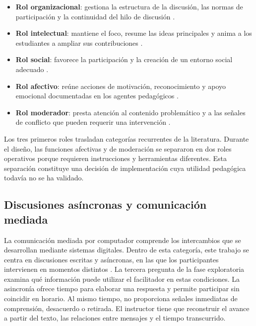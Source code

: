 \begin{itemize}
    \item \textbf{Rol organizacional}: gestiona la estructura de la discusión, las normas de participación y la continuidad del hilo de discusión \parencite{Abdous2011,PilkingtonWalker2003}.
    \item \textbf{Rol intelectual}: mantiene el foco, resume las ideas principales y anima a los estudiantes a ampliar sus contribuciones \parencite{Abdous2011}.
    \item \textbf{Rol social}: favorece la participación y la creación de un entorno social adecuado \parencite{Paulsen1995,Abdous2011}.
    \item \textbf{Rol afectivo}: reúne acciones de motivación, reconocimiento y apoyo emocional documentadas en los agentes pedagógicos \parencite{SikstromEtAl2022,BlignautTrollip2003}.
    \item \textbf{Rol moderador}: presta atención al contenido problemático y a las señales de conflicto que pueden requerir una intervención \parencite{Rovai2007,KorreEtAl2025}.
\end{itemize}

Los tres primeros roles trasladan categorías recurrentes de la literatura. Durante el diseño, las funciones afectivas y de moderación se separaron en dos roles operativos porque requieren instrucciones y herramientas diferentes. Esta separación constituye una decisión de implementación cuya utilidad pedagógica todavía no se ha validado.

\subsection{Discusiones asíncronas y comunicación mediada}

La comunicación mediada por computador comprende los intercambios que se desarrollan mediante sistemas digitales. Dentro de esta categoría, este trabajo se centra en discusiones escritas y asíncronas, en las que los participantes intervienen en momentos distintos \parencite{Rovai2007,MasseyEtAl2019}. La tercera pregunta de la fase exploratoria examina qué información puede utilizar el facilitador en estas condiciones. La asincronía ofrece tiempo para elaborar una respuesta y permite participar sin coincidir en horario. Al mismo tiempo, no proporciona señales inmediatas de comprensión, desacuerdo o retirada. El instructor tiene que reconstruir el avance a partir del texto, las relaciones entre mensajes y el tiempo transcurrido.

